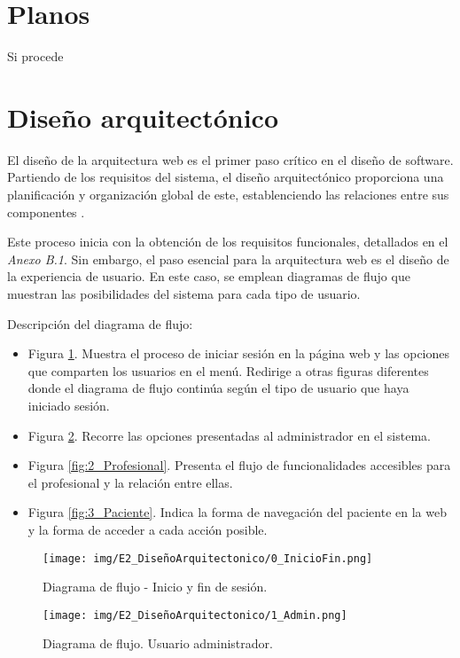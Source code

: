
\section{Planos}

Si procede

\section{Diseño arquitectónico}
El diseño de la arquitectura web es el primer paso crítico en el diseño de software. Partiendo de los requisitos del sistema, el diseño arquitectónico proporciona una planificación y organización global de este, establenciendo las relaciones entre sus componentes \cite{castro2015arquitectura}.

Este proceso inicia con la obtención de los requisitos funcionales, detallados en el \textit{Anexo B.1}. Sin embargo, el paso esencial para la arquitectura web es el diseño de la experiencia de usuario. En este caso, se emplean diagramas de flujo que muestran las posibilidades del sistema para cada tipo de usuario.

Descripción del diagrama de flujo:
\begin{itemize}
    \item Figura \ref{fig:0_InicioFin}. Muestra el proceso de iniciar sesión en la página web y las opciones que comparten los usuarios en el menú. Redirige a otras figuras diferentes donde el diagrama de flujo continúa según el tipo de usuario que haya iniciado sesión.
    \item Figura \ref{fig:1_Admin}. Recorre las opciones presentadas al administrador en el sistema.
    \item Figura \ref{fig:2_Profesional}. Presenta el flujo de funcionalidades accesibles para el profesional y la relación entre ellas.
    \item Figura \ref{fig:3_Paciente}. Indica la forma de navegación del paciente en la web y la forma de acceder a cada acción posible.
\end{itemize}


\begin{figure}[h]
    \centering
    \texttt{[image: img/E2\_DiseñoArquitectonico/0\_InicioFin.png]}
    \caption{Diagrama de flujo - Inicio y fin de sesión.}
    \label{fig:0_InicioFin}
\end{figure}

\begin{figure}[h]
    \centering
    \texttt{[image: img/E2\_DiseñoArquitectonico/1\_Admin.png]}
    \caption{Diagrama de flujo. Usuario administrador.}
    \label{fig:1_Admin}
\end{figure}

